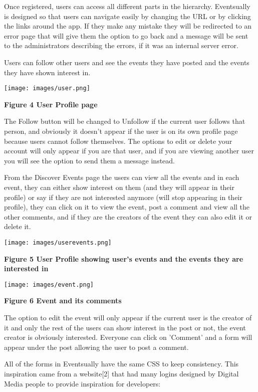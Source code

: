 \documentclass[10pt, a4paper]{article}
\begin{document}
Once registered, users can access all different parts in the hierarchy. Eventsually is designed so that users can navigate easily by changing the URL or by clicking the links around the app. If they make any mistake they will be redirected to an error page that will give them the option to go back and a message will be sent to the administrators describing the errors, if it was an internal server error.

Users can follow other users and see the events they have posted and the events they have shown interest in.

    \texttt{[image: images/user.png]}

    \textbf{Figure 4 User Profile page}
    \vspace{2mm}

The Follow button will be changed to Unfollow if the current user follows that person, and obviously it doesn't appear if the user is on its own profile page because users cannot follow themselves. The options to edit or delete your account will only appear if you are that user, and if you are viewing another user you will see the option to send them a message instead.

From the Discover Events page the users can view all the events and in each event, they can either show interest on them (and they will appear in their profile) or say if they are not interested anymore (will stop appearing in their profile), they can click on it to view the event, post a comment and view all the other comments, and if they are the creators of the event they can also edit it or delete it.

    \texttt{[image: images/userevents.png]}

    \textbf{Figure 5 User Profile showing user's events and the events they are interested in}
    \vspace{2mm}

    \texttt{[image: images/event.png]}

    \textbf{Figure 6 Event and its comments}
    \vspace{2mm}

The option to edit the event will only appear if the current user is the creator of it and only the rest of the users can show interest in the post or not, the event creator is obviously interested. Everyone can click on 'Comment' and a form will appear under the post allowing the user to post a comment.

All of the forms in Eventsually have the same CSS to keep consistency. This inspiration came from a website[2] that had many logins designed by Digital Media people to provide inspiration for developers:
\end{document}
